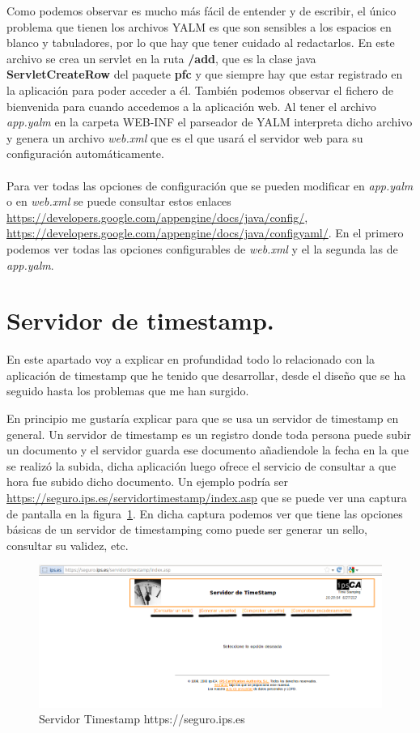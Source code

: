Como podemos observar es mucho más fácil de entender y de escribir, el único problema que tienen los archivos YALM es que son sensibles a los espacios en blanco y tabuladores, por lo que hay que tener cuidado al redactarlos. En este archivo se crea un servlet en la ruta \textbf{/add}, que es la clase java \textbf{ServletCreateRow} del paquete \textbf{pfc} y que siempre hay que estar registrado en la aplicación para poder acceder a él. También podemos observar el fichero de bienvenida para cuando accedemos a la aplicación web. 
Al tener el archivo \textit{app.yalm} en la carpeta WEB-INF el parseador de YALM interpreta dicho archivo y genera un archivo \textit{web.xml} que es el que usará el servidor web para su configuración automáticamente.
\\
\\
Para ver todas las opciones de configuración que se pueden modificar en \textit{app.yalm} o en \textit{web.xml} se puede consultar estos enlaces \url{https://developers.google.com/appengine/docs/java/config/}, \url{https://developers.google.com/appengine/docs/java/configyaml/}. En el primero podemos ver todas las opciones configurables de \textit{web.xml} y el la segunda las de \textit{app.yalm}.

\section{Servidor de timestamp.}
En este apartado voy a explicar en profundidad todo lo relacionado con la aplicación de timestamp que he tenido que desarrollar, desde el diseño que se ha seguido hasta los problemas que me han surgido.

En principio me gustaría explicar para que se usa un servidor de timestamp en general. Un servidor de timestamp es un registro donde toda persona puede subir un documento y el servidor guarda ese documento añadiendole la fecha en la que se realizó la subida, dicha aplicación luego ofrece el servicio de consultar a que hora fue subido dicho documento. Un ejemplo podría ser \url{https://seguro.ips.es/servidortimestamp/index.asp} que se puede ver una captura de pantalla en la figura~\ref{fig:server_ips_timestamp}. En dicha captura podemos ver que tiene las opciones básicas de un servidor de timestamping como puede ser generar un sello, consultar su validez, etc. 

\begin{figure}[hbt]
  \centering
    \includegraphics[scale=0.5]{./GoogleAppEngine/imagenes/server_ips_timestamp.png}
  \caption{Servidor Timestamp https://seguro.ips.es}
  \label{fig:server_ips_timestamp}
\end{figure}

